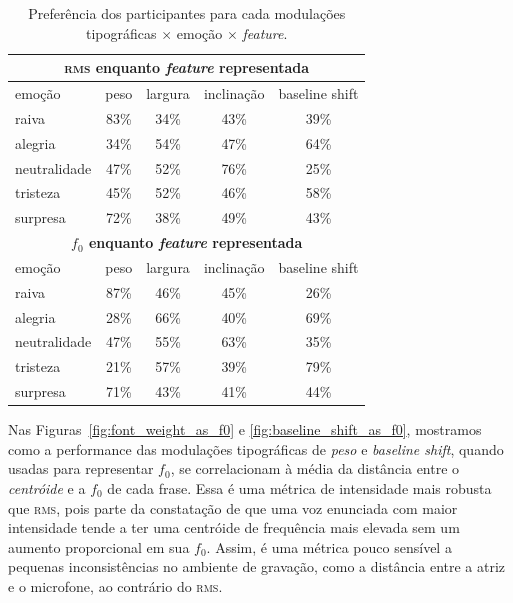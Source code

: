 \documentclass[11pt]{article}
\begin{document}
\begin{table}
    \small
    \begin{tabular*}{\linewidth}{lcccc}
        \toprule
        \multicolumn{5}{c}{ \textbf{\textsc{rms} enquanto {\itshape feature} representada} }     \\
        \midrule
        emoção & peso & largura & inclinação & baseline shift  \\
        \midrule
        raiva           & 83\% & 34\% & 43\% & 39\% \\
        alegria         & 34\% & 54\% & 47\% & 64\% \\
        neutralidade    & 47\% & 52\% & \cellcolor[HTML]{9ef7cd}76\% & 25\% \\
        tristeza        & 45\% & 52\% & 46\% & 58\% \\
        surpresa        & \cellcolor[HTML]{9ef7cd}72\% & 38\% & 49\% & 43\% \\
        \midrule
        \multicolumn{5}{c}{ \textbf{$f_0$ enquanto {\itshape feature} representada} }      \\
        \midrule
        emoção & peso & largura & inclinação & baseline shift  \\
        \midrule
        raiva           & \cellcolor[HTML]{9ef7cd}87\% & 46\% & 45\% & 26\% \\
        alegria         & 28\% & 66\% & 40\% & \cellcolor[HTML]{9ef7cd}69\% \\
        neutralidade    & 47\% & 55\% & 63\% & 35\% \\
        tristeza        & 21\% & 57\% & 39\% & \cellcolor[HTML]{9ef7cd}79\% \\
        surpresa        & 71\% & 43\% & 41\% & 44\% \\
        \bottomrule
    \end{tabular*}
    \caption{Preferência dos participantes para cada modulações tipográficas $\times$ emoção $\times$ {\itshape feature}. }
    \label{tab:type_perf}
\end{table}
  
  Nas Figuras~\ref{fig:font_weight_as_f0} e \ref{fig:baseline_shift_as_f0}, mostramos como a performance das modulações tipográficas de {\itshape peso} e {\itshape baseline shift}, quando usadas para representar $f_0$, se correlacionam à média da distância entre o {\itshape centróide} e a $f_0$ de cada frase. Essa é uma métrica de intensidade mais robusta que \textsc{rms}, pois parte da constatação de que uma voz enunciada com maior intensidade tende a ter uma centróide de frequência mais elevada sem um aumento proporcional em sua $f_0$. Assim, é uma métrica pouco sensível a pequenas inconsistências no ambiente de gravação, como a distância entre a atriz e o microfone, ao contrário do \textsc{rms}.
  
\end{document}
